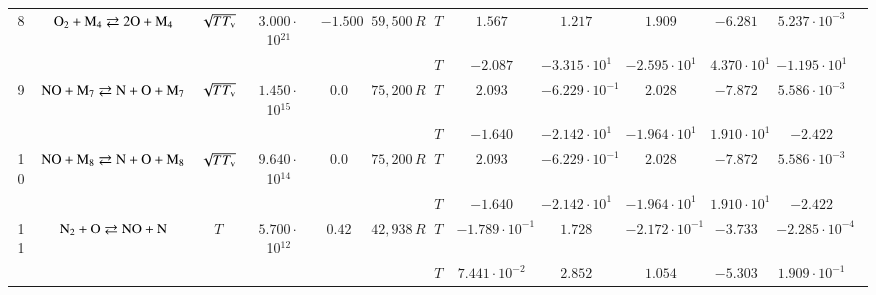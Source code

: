 \documentclass{warpdoc}
\begin{document}
\begin{table}[!ht]
\begin{center}
\begin{threeparttable}
\begin{tabular}{ccccccccccccc}
8 & $\rm O_2 + M_4 \rightleftarrows 2O+M_4$ &$\sqrt{T T_{\rm v}}$ & $3.000 \cdot$ 10$^{21}$ & $-1.500$ & $59,500\, R$ 
                                          &$T$  & $1.567$  & $1.217$  & $1.909$ & $-6.281$ & $5.237 \cdot 10^{-3}$ & \multirow{2}{*}{\cite{ijhmt:2020:kim,ijhmt:2021:kim}} \\
 & & & & &                                &$T$  & $-2.087$  & $-3.315 \cdot 10^{1}$  & $-2.595 \cdot 10^{1}$ & $4.370 \cdot 10^{1}$ & $-1.195 \cdot 10^{1}$ & ~ \\
 
                                                                                   
9 & $\rm NO + M_7 \rightleftarrows N+O+M_7$ &$\sqrt{T T_{\rm v}}$ & $1.450 \cdot$ 10$^{15}$ & $0.0$ & $75,200\, R$ 
                                          &$T$  & $2.093$  & $-6.229 \cdot 10^{-1}$  & $2.028$ & $-7.872$ & $5.586 \cdot 10^{-3}$ & \multirow{2}{*}{\cite{jpcrd:1991:tsang,ijhmt:2021:kim}} \\
 & & & & &                                &$T$  & $-1.640$  & $-2.142 \cdot 10^{1}$  & $-1.964 \cdot 10^{1}$ & $1.910 \cdot 10^{1}$ & $-2.422$ & ~ \\                                          
                                                                                    
10 & $\rm NO + M_8 \rightleftarrows N+O+M_8$ &$\sqrt{T T_{\rm v}}$ & $9.640 \cdot$ 10$^{14}$ & $0.0$ & $75,200\, R$ 
                                          &$T$  & $2.093$  & $-6.229 \cdot 10^{-1}$  & $2.028$ & $-7.872$ & $5.586 \cdot 10^{-3}$ & \multirow{2}{*}{\cite{jpcrd:1991:tsang,ijhmt:2021:kim}} \\
 & & & & &                                &$T$  & $-1.640$  & $-2.142 \cdot 10^{1}$  & $-1.964 \cdot 10^{1}$ & $1.910 \cdot 10^{1}$ & $-2.422$ & ~ \\
 
                                                                                                           
11 & $\rm N_2 + O \rightleftarrows NO+N$ &$T$ & $5.700\cdot$ 10$^{12}$ & $0.42$ & $42,938\, R$ 
                                          &$T$  & $-1.789 \cdot 10^{-1}$  & $1.728$  & $-2.172 \cdot 10^{-1}$ & $-3.733$ & $-2.285 \cdot 10^{-4}$ & \multirow{2}{*}{\cite{jcp:1996:bose,ijhmt:2021:kim}} \\
 & & & & &                                &$T$  & $7.441 \cdot 10^{-2}$  & $2.852$  & $1.054$ & $-5.303$ & $1.909 \cdot 10^{-1}$ & ~ \\
 

\end{tabular}
\end{threeparttable}
\end{center}
\end{table}
\end{document}

